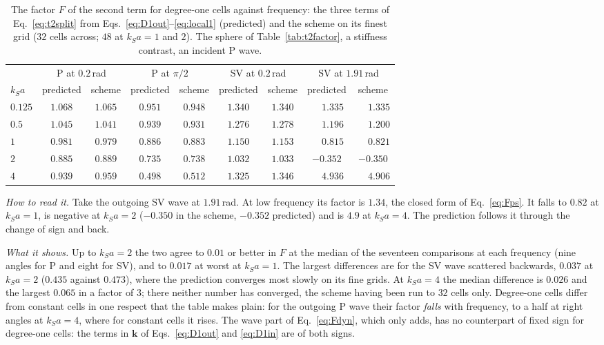 \documentclass[11pt,a4paper]{article}
\newcommand{\bk}{\mathbf{k}}
\begin{document}
\begin{table}[htbp]
\centering
\caption{The factor $F$ of the second term for degree-one cells against frequency: the three terms of
Eq.~\eqref{eq:t2split} from Eqs.~\eqref{eq:D1out}--\eqref{eq:local1} (predicted) and the scheme on its
finest grid ($32$ cells across; $48$ at $k_Sa=1$ and $2$). The sphere of Table~\ref{tab:t2factor}, a
stiffness contrast, an incident P wave.}\label{tab:factorfreq1}
\small
\begin{tabular}{@{}lcccccccc@{}}
\toprule
 & \multicolumn{2}{c}{P at $0.2$\,rad} & \multicolumn{2}{c}{P at $\pi/2$} &
   \multicolumn{2}{c}{SV at $0.2$\,rad} & \multicolumn{2}{c}{SV at $1.91$\,rad} \\
$k_Sa$ & predicted & scheme & predicted & scheme & predicted & scheme & predicted & scheme \\
\midrule
$0.125$ & $1.068$ & $1.065$ & $0.951$ & $0.948$ & $1.340$ & $1.340$ & $\phantom{-}1.335$ & $\phantom{-}1.335$ \\
$0.5$   & $1.045$ & $1.041$ & $0.939$ & $0.931$ & $1.276$ & $1.278$ & $\phantom{-}1.196$ & $\phantom{-}1.200$ \\
$1$     & $0.981$ & $0.979$ & $0.886$ & $0.883$ & $1.150$ & $1.153$ & $\phantom{-}0.815$ & $\phantom{-}0.821$ \\
$2$     & $0.885$ & $0.889$ & $0.735$ & $0.738$ & $1.032$ & $1.033$ & $-0.352$ & $-0.350$ \\
$4$     & $0.939$ & $0.959$ & $0.498$ & $0.512$ & $1.325$ & $1.346$ & $\phantom{-}4.936$ & $\phantom{-}4.906$ \\
\bottomrule
\end{tabular}
\end{table}

\emph{How to read it.} Take the outgoing SV wave at $1.91$\,rad. At low frequency its factor is $1.34$,
the closed form of Eq.~\eqref{eq:Fps}. It falls to $0.82$ at $k_Sa=1$, is negative at $k_Sa=2$ ($-0.350$
in the scheme, $-0.352$ predicted) and is $4.9$ at $k_Sa=4$. The prediction follows it through the
change of sign and back.

\emph{What it shows.} Up to $k_Sa=2$ the two agree to $0.01$ or better in $F$ at the median of the
seventeen comparisons at each frequency (nine angles for P and eight for SV), and to $0.017$ at worst at
$k_Sa=1$. The largest differences are for the SV wave scattered backwards, $0.037$ at $k_Sa=2$ ($0.435$
against $0.473$), where the prediction converges most slowly on its fine grids. At $k_Sa=4$ the median
difference is $0.026$ and the largest $0.065$ in a factor of $3$; there neither number has converged, the
scheme having been run to $32$ cells only. Degree-one cells differ from constant cells in one respect
that the table makes plain: for the outgoing P wave their factor \emph{falls} with frequency, to a half
at right angles at $k_Sa=4$, where for constant cells it rises. The wave part of Eq.~\eqref{eq:Fdyn},
which only adds, has no counterpart of fixed sign for degree-one cells: the terms in $\bk$ of
Eqs.~\eqref{eq:D1out} and \eqref{eq:D1in} are of both signs.
\end{document}
